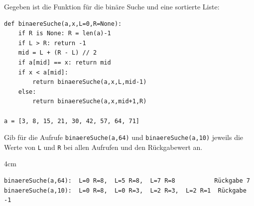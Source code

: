 \question[3]
Gegeben ist die Funktion für die binäre Suche und eine sortierte Liste:
\begin{lstlisting}
def binaereSuche(a,x,L=0,R=None):
    if R is None: R = len(a)-1
    if L > R: return -1
    mid = L + (R - L) // 2
    if a[mid] == x: return mid
    if x < a[mid]:
        return binaereSuche(a,x,L,mid-1)
    else:
        return binaereSuche(a,x,mid+1,R)

a = [3, 8, 15, 21, 30, 42, 57, 64, 71]
\end{lstlisting}
Gib für die Aufrufe \texttt{binaereSuche(a,64)} und \texttt{binaereSuche(a,10)} jeweils die Werte von
\texttt{L} und \texttt{R} bei allen Aufrufen und den Rückgabewert an.
\begin{solutionbox}{4cm}
\begin{lstlisting}[language={}]
binaereSuche(a,64):  L=0 R=8,  L=5 R=8,  L=7 R=8           Rückgabe 7
binaereSuche(a,10):  L=0 R=8,  L=0 R=3,  L=2 R=3,  L=2 R=1  Rückgabe -1
\end{lstlisting}
\end{solutionbox}
